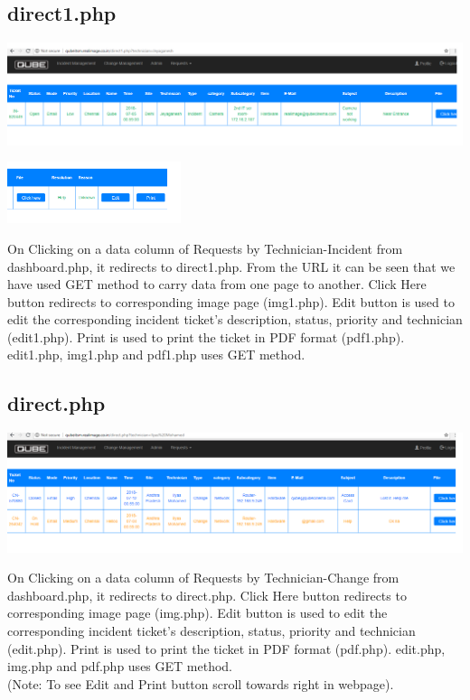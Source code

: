\documentclass{article}
\begin{document}
\subsection{direct1.php}
\begin{center}

    \includegraphics[width=7.0in]{direct1.png}
   
    \label{}

\end{center}
\begin{center}

    \includegraphics[width=2.0in]{direct1a.png}
   
    \label{}

\end{center}
On Clicking on a data column of Requests by Technician-Incident from dashboard.php, it redirects to direct1.php. From the URL it can be seen that we have used GET method to carry data from one page to another. Click Here button redirects to corresponding image page \big(img1.php\big). Edit button is used to edit the corresponding incident ticket's description, status, priority and technician \big(edit1.php\big). Print is used to print the ticket in PDF format \big(pdf1.php\big). edit1.php, img1.php and pdf1.php uses GET method.
\subsection{direct.php}
\begin{center}

    \includegraphics[width=7.0in]{direct.png}
   
    \label{}

\end{center}
On Clicking on a data column of Requests by Technician-Change from dashboard.php, it redirects to direct.php. Click Here button redirects to corresponding image page \big(img.php\big). Edit button is used to edit the corresponding incident ticket's description, status, priority and technician \big(edit.php\big). Print is used to print the ticket in PDF format \big(pdf.php\big). edit.php, img.php and pdf.php uses GET method.\\
\big(Note: To see Edit and Print button scroll towards right in webpage\big).
\end{document}

